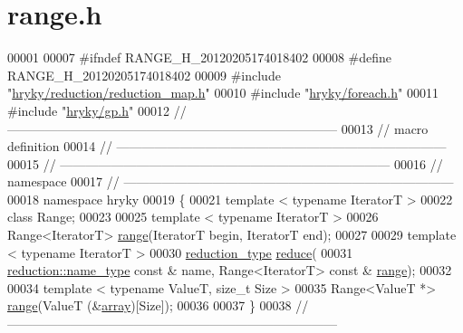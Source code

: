 \hypertarget{range_8h_source}{\section{range.\-h}
}

\begin{DoxyCode}
00001 
00007 \textcolor{preprocessor}{#ifndef RANGE\_H\_20120205174018402}
00008 \textcolor{preprocessor}{}\textcolor{preprocessor}{#define RANGE\_H\_20120205174018402}
00009 \textcolor{preprocessor}{}\textcolor{preprocessor}{#include "\hyperlink{reduction__map_8h}{hryky/reduction/reduction_map.h}"}
00010 \textcolor{preprocessor}{#include "\hyperlink{foreach_8h}{hryky/foreach.h}"}
00011 \textcolor{preprocessor}{#include "\hyperlink{gp_8h}{hryky/gp.h}"}
00012 \textcolor{comment}{//
      ------------------------------------------------------------------------------}
00013 \textcolor{comment}{// macro definition}
00014 \textcolor{comment}{//
      ------------------------------------------------------------------------------}
00015 \textcolor{comment}{//
      ------------------------------------------------------------------------------}
00016 \textcolor{comment}{// namespace}
00017 \textcolor{comment}{//
      ------------------------------------------------------------------------------}
00018 \textcolor{keyword}{namespace }hryky
00019 \{
00021     \textcolor{keyword}{template} < \textcolor{keyword}{typename} IteratorT >
00022     \textcolor{keyword}{class }Range;
00023 
00025     \textcolor{keyword}{template} < \textcolor{keyword}{typename} IteratorT >
00026     Range<IteratorT> \hyperlink{namespacehryky_a6093192359bc9630d58d6158bd0178f4}{range}(IteratorT begin, IteratorT end);
00027 
00029     \textcolor{keyword}{template} < \textcolor{keyword}{typename} IteratorT >
00030     \hyperlink{namespacehryky_a343a9a4c36a586be5c2693156200eadc}{reduction_type} \hyperlink{namespacehryky_af41cb3af6766761da0ff21b84527a52c}{reduce}(
00031         \hyperlink{namespacehryky_1_1reduction_ac686c30a4c8d196bbd0f05629a6b921f}{reduction::name_type} \textcolor{keyword}{const} & name, Range<IteratorT> \textcolor{keyword}{const} & \hyperlink{namespacehryky_a6093192359bc9630d58d6158bd0178f4}{range});
00032 
00034     \textcolor{keyword}{template} < \textcolor{keyword}{typename} ValueT, \textcolor{keywordtype}{size\_t} Size >
00035     Range<ValueT *> \hyperlink{namespacehryky_a6093192359bc9630d58d6158bd0178f4}{range}(ValueT (&\hyperlink{namespacehryky_1_1reduction_a9d45a4dc1ea9a6668ebd192f296f788c}{array})[Size]);
00036 
00037 \}
00038 \textcolor{comment}{//
      ------------------------------------------------------------------------------}

\end{DoxyCode}
